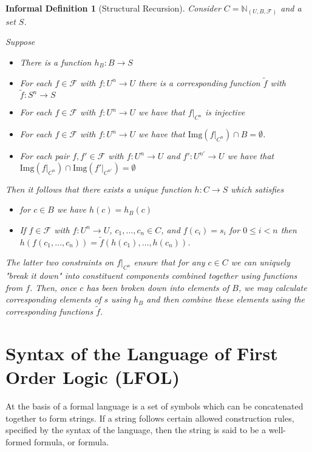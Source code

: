 \documentclass[12pt]{article}
\theoremstyle{break}
\theoremstyle{break}
\theoremstyle{break}
\theoremstyle{break}
\theoremstyle{break}
\newtheorem{informal definition}[definition]{Informal Definition}
\newcommand{\NUBF}[0]{\mathbb{N}_{(U, B, \mathcal{F})}}
\begin{document}
\begin{informal definition}[Structural Recursion]
Consider $C = \NUBF$ and a set $S$.

Suppose

\begin{itemize}
\item{There is a function $h_B: B \to S$}
\item{For each $f\in \mathcal{F}$ with $f:U^n \to U$ there is a corresponding function $\tilde{f}$ with $\tilde{f}:S^n \to S$}
\item{For each $f\in \mathcal{F}$ with $f:U^n \to U$ we have that $f|_{C^n}$ is injective}
\item{For each $f\in \mathcal{F}$ with $f:U^n \to U$ we have that $\text{Img}(f|_{C^n}) \cap B = \emptyset$.}
\item{For each pair $f, f' \in \mathcal{F}$ with $f:U^n \to U$ and $f':U^{n'}\to U$ we have that $\text{Img}(f|_{C^n}) \cap \text{Img}(f'|_{C^{n'}}) = \emptyset$}
\end{itemize}

Then it follows that there exists a unique function $h:C \to S$ which satisfies

\begin{itemize}
\item{for $c\in B$ we have $h(c) = h_B(c)$}
\item{If $f\in \mathcal{F}$ with $f:U^n \to U$, $c_1, \ldots, c_n \in C$, and $f(c_i) = s_i$ for $0\le i < n$ then $h(f(c_1, \ldots, c_n)) = \tilde{f}(h(c_1), \ldots, h(c_n))$.}
\end{itemize}

The latter two constraints on $f|_{C^n}$ ensure that for any $c\in C$ we can uniquely "break it down" into constituent components combined together using functions from $f$.
Then, once $c$ has been broken down into elements of $B$, we may calculate corresponding elements of $s$ using $h_B$ and then combine these elements using the corresponding functions $\tilde{f}$.
\end{informal definition}

\newpage
\section{Syntax of the Language of First Order Logic (LFOL)}

At the basis of a formal language is a set of symbols which can be concatenated together to form strings.
If a string follows certain allowed construction rules, specified by the syntax of the language, then the string is said to be a well-formed formula, or formula.
\end{document}
